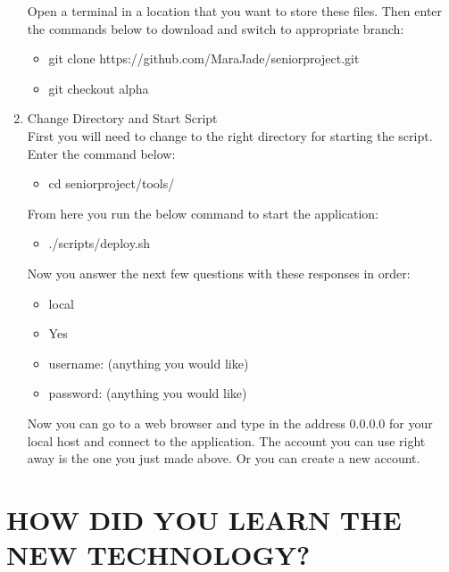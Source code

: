 \documentclass[draftclsnofoot,10pt,onecolumn]{IEEEtran} %
\begin{document}
\begin{enumerate}
	Open a terminal in a location that you want to store these files. Then enter the commands below to download and switch to 
	appropriate branch:
	
	\begin{itemize}
		\item git clone https://github.com/MaraJade/seniorproject.git
		\item git checkout alpha \\
	\end{itemize}
	
	\item Change Directory and Start Script \\
	
	First you will need to change to the right directory for starting the script. Enter the command below:
	
	\begin{itemize}
		\item cd seniorproject/tools/ \\
	\end{itemize}
	
	From here you run the below command to start the application:
	
	\begin{itemize}
		\item ./scripts/deploy.sh \\
	\end{itemize}
	
	Now you answer the next few questions with these responses in order:
	
	\begin{itemize}
		\item local
		\item Yes
		\item username: (anything you would like)
		\item password: (anything you would like) \\
	\end{itemize}
	
	Now you can go to a web browser and type in the address 0.0.0.0 for your local host and connect to the application. 
	The account you can use right away is the one you just made above. Or you can create a new account. \\
	
	
\end{enumerate}

\section{HOW DID YOU LEARN THE NEW TECHNOLOGY?}
\end{document}

